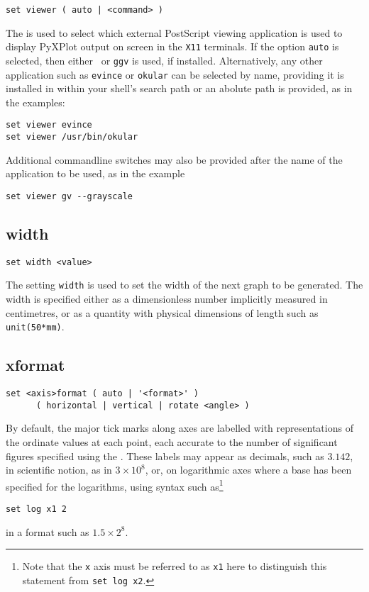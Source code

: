 \begin{verbatim}
set viewer ( auto | <command> )
\end{verbatim}

The  is used to select which external PostScript viewing
application is used to display PyXPlot output on screen in the {\tt X11}
terminals. If the option {\tt auto} is selected, then either \ghostview\ or
{\tt ggv} is used, if installed. Alternatively, any other application such as
{\tt evince} or {\tt okular} can be selected by name, providing it is installed
in within your shell's search path or an abolute path is provided, as in the
examples:

\begin{verbatim}
set viewer evince
set viewer /usr/bin/okular
\end{verbatim}

\noindent Additional commandline switches may also be provided after the name
of the application to be used, as in the example

\begin{verbatim}
set viewer gv --grayscale
\end{verbatim}


\subsection{width}

\begin{verbatim}
set width <value>
\end{verbatim}

The setting {\tt width} is used to set the width of the next graph to be
generated. The width is specified either as a dimensionless number
implicitly measured in centimetres, or as a quantity with physical dimensions
of length such as {\tt unit(50*mm)}.


\subsection{xformat}

\begin{verbatim}
set <axis>format ( auto | '<format>' )
      ( horizontal | vertical | rotate <angle> )
\end{verbatim}

By default, the major tick marks along axes are labelled with representations
of the ordinate values at each point, each accurate to the number of
significant figures specified using the . These
labels may appear as decimals, such as $3.142$, in scientific notion, as in
$3\times10^8$, or, on logarithmic axes where a base has been specified for the
logarithms, using syntax such as\footnote{Note that the {\tt x} axis must be
referred to as {\tt x1} here to distinguish this statement from {\tt set log
x2}.}
\begin{verbatim}
set log x1 2
\end{verbatim}
in a format such as $1.5\times2^8$.

